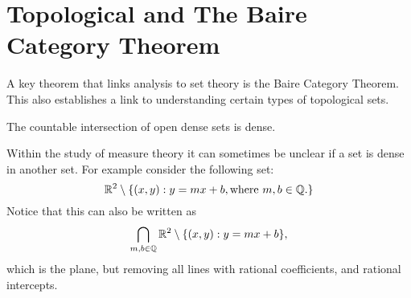 \section{Topological and The Baire Category Theorem}
A key theorem that links analysis to set theory is the Baire Category Theorem.  This also establishes a link to understanding certain types of topological sets.  
\begin{theorem}%
    The countable intersection of open dense sets is dense.  
\end{theorem}

Within the study of measure theory it can sometimes be unclear if a set is dense in another set.  For example consider the following set: 
$$\mathbb{R}^2 \setminus \{(x,y): y=mx + b, \text{where $m, b \in \mathbb{Q}$.}\}$$
Notice that this can also be written as $$\bigcap_{m,b \in \mathbb{Q}} \mathbb{R}^2 \setminus \{(x,y): y=mx+b\}, $$ which is the plane, but removing all lines with rational coefficients, and rational intercepts.  